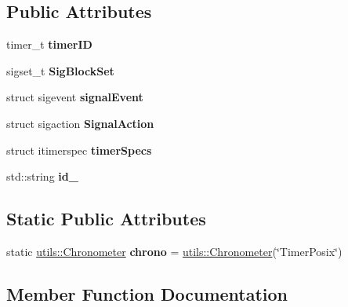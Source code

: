 \subsection*{Public Attributes}
\begin{DoxyCompactItemize}
\item 
\mbox{\label{classTimerPosix_a9554ddc8cb1185be4dc32487bb8f4773}} 
timer\+\_\+t {\bfseries timer\+ID}
\item 
\mbox{\label{classTimerPosix_a966f56106600e6413b24fd41c010730d}} 
sigset\+\_\+t {\bfseries Sig\+Block\+Set}
\item 
\mbox{\label{classTimerPosix_ae624207220776d1b272744131aa39ca0}} 
struct sigevent {\bfseries signal\+Event}
\item 
\mbox{\label{classTimerPosix_ad0a5559e579653d3066787e0266fb3c8}} 
struct sigaction {\bfseries Signal\+Action}
\item 
\mbox{\label{classTimerPosix_a7131277458f07dcb3440301350b70f3e}} 
struct itimerspec {\bfseries timer\+Specs}
\item 
\mbox{\label{classTimerPosix_acc7146e8d22986242f777b57627a558d}} 
std\+::string {\bfseries id\+\_\+}
\end{DoxyCompactItemize}
\subsection*{Static Public Attributes}
\begin{DoxyCompactItemize}
\item 
\mbox{\label{classTimerPosix_a0a70d15da40ac1d4daa906f30d4c075a}} 
static \hyperlink{classutils_1_1Chronometer}{utils\+::\+Chronometer} {\bfseries chrono} = \hyperlink{classutils_1_1Chronometer}{utils\+::\+Chronometer}(\char`\"{}Timer\+Posix\char`\"{})
\end{DoxyCompactItemize}


\subsection{Member Function Documentation}
\mbox{\label{classTimerPosix_af7cfc4df52fb786aac3ceb435e32c0bf}} 
